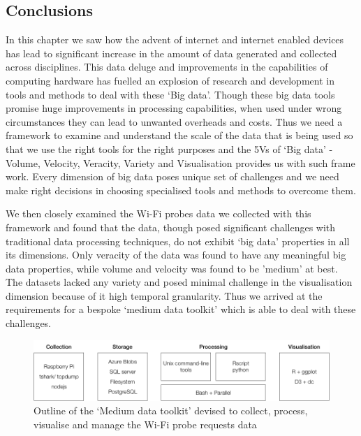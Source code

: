 
\subsection{Conclusions}

In this chapter we saw how the advent of internet and internet enabled devices has lead to significant increase in the amount of data generated and collected across disciplines. 
This data deluge and improvements in the capabilities of computing hardware has fuelled an explosion of research and development in tools and methods to deal with these `Big data'.
Though these big data tools promise huge improvements in processing capabilities, when used under wrong circumstances they can lead to unwanted overheads and costs.
Thus we need a framework to examine and understand the scale of the data that is being used so that we use the right tools for the right purposes and the 5Vs of `Big data' - Volume, Velocity, Veracity, Variety and Visualisation provides us with such frame work.
Every dimension of big data poses unique set of challenges and we need make right decisions in choosing specialised tools and methods to overcome them.

We then closely examined the Wi-Fi probes data we collected with this framework and found that the data, though posed significant challenges with traditional data processing techniques, do not exhibit `big data' properties in all its dimensions. 
Only veracity of the data was found to have any meaningful big data properties, while volume and velocity was found to be 'medium' at best. 
The datasets lacked any variety and posed minimal challenge in the visualisation dimension because of it high temporal granularity.
Thus we arrived at the requirements for a bespoke `medium data toolkit' which is able to deal with these challenges.

\begin{figure}
  \includegraphics{images/toolkit.png}
  \caption{Outline of the `Medium data toolkit' devised to collect, process, visualise and manage the Wi-Fi probe requests data}
  \label{figure:toolkit}
\end{figure}

